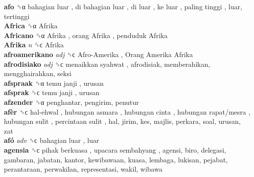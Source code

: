 \textbf{afo} ␝α   bahagian luar ,  di bahagian luar ,  di luar ,  ke luar ,  paling tinggi , luar, tertinggi  \\
\textbf{Africa} ␝α   Afrika   \\
\textbf{Africano} ␝α   Afrika ,  orang Afrika ,  penduduk Afrika   \\
\textbf{Afrika} \emph{n}  ␝ϲ   Afrika   \\
\textbf{afroamerikano} \emph{adj}  ␝ϲ   Afro-Amerika ,  Orang Amerika Afrika   \\
\textbf{afrodisiako} \emph{adj}  ␝ϲ   menaikkan syahwat , afrodisiak, memberahikan, mengghairahkan, seksi  \\
\textbf{afspraak} ␝α   temu janji , urusan  \\
\textbf{afsprak} ␝ϲ   temu janji , urusan  \\
\textbf{afzender} ␝α  penghantar, pengirim, penutur  \\
\textbf{afèr} ␝ϲ   hal-ehwal ,  hubungan asmara ,  hubungan cinta ,  hubungan rapat/mesra ,  hubungan sulit ,  percintaan sulit , hal, jirim, kes, majlis, perkara, soal, urusan, zat  \\
\textbf{afó} \emph{adv}  ␝ϲ   bahagian luar , luar  \\
\textbf{agensia} ␝ϲ   pihak berkuasa ,  upacara sembahyang , agensi, biro, delegasi, gambaran, jabatan, kantor, kewibawaan, kuasa, lembaga, lukisan, pejabat, perantaraan, perwakilan, representasi, wakil, wibawa  \\
